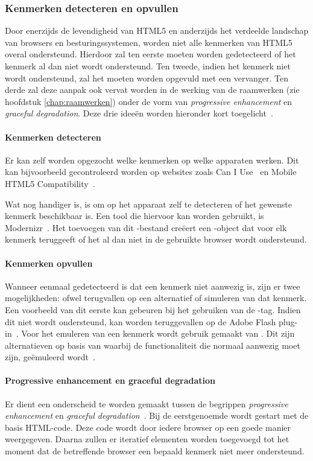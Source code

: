 \subsubsection{Kenmerken detecteren en opvullen}
Door enerzijds de levendigheid van HTML5 en anderzijds het verdeelde landschap van browsers en besturingssystemen, worden niet alle kenmerken van HTML5 overal ondersteund. 
Hierdoor zal ten eerste moeten worden gedetecteerd of het kenmerk al dan niet wordt ondersteund.
Ten tweede, indien het kenmerk niet wordt ondersteund, zal het moeten worden opgevuld met een vervanger.
Ten derde zal deze aanpak ook vervat worden in de werking van de raamwerken (zie hoofdstuk \ref{chap:raamwerken}) onder de vorm van \emph{progressive enhancement} en \emph{graceful degradation}.
Deze drie ideeën worden hieronder kort toegelicht~\cite{MacDonald2011}.

\paragraph{Kenmerken detecteren}
Er kan zelf worden opgezocht welke kenmerken op welke apparaten werken.
Dit kan bijvoorbeeld gecontroleerd worden op websites zoals Can I Use~\cite{Deveria2013c} en Mobile HTML5 Compatibility~\cite{Firtman2013a}. 

Wat nog handiger is, is om op het apparaat zelf te detecteren of het gewenste kenmerk beschikbaar is. 
Een tool die hiervoor kan worden gebruikt, is Modernizr~\cite{Modernizr2012}. 
Het toevoegen van dit \js{}-bestand creëert een \js{}-object dat voor elk kenmerk teruggeeft of het al dan niet in de gebruikte browser wordt ondersteund.

\paragraph{Kenmerken opvullen}
Wanneer eenmaal gedetecteerd is dat een kenmerk niet aanwezig is, zijn er twee mogelijkheden: ofwel terugvallen op een alternatief of simuleren van dat kenmerk. 
Een voorbeeld van dit eerste kan gebeuren bij het gebruiken van de -tag. 
Indien dit niet wordt ondersteund, kan worden teruggevallen op de Adobe Flash plug-in~\cite{Adobe2013}. 
Voor het emuleren van een kenmerk wordt gebruik gemaakt van . 
Dit zijn alternatieven op basis van \js{} waarbij de  functionaliteit die normaal aanwezig moet zijn, geëmuleerd wordt~\cite{Weyl2011}.

\paragraph{Progressive enhancement en graceful degradation}
\label{par:progressive-enhancement}
Er dient een onderscheid te worden gemaakt tussen de begrippen \emph{progressive enhancement} en \emph{graceful degradation}~\cite{Hens2012}. 
Bij de eerstgenoemde wordt gestart met de basis HTML-code.
Deze code wordt door iedere browser op een goede manier weergegeven. 
Daarna zullen er iteratief elementen worden toegevoegd tot het moment dat de betreffende browser een bepaald kenmerk niet meer ondersteund.

